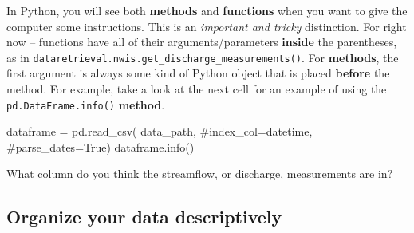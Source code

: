 \documentclass[
  letterpaper,
  DIV=11,
  numbers=noendperiod,
  oneside]{scrreprt}
\newenvironment{Shaded}{\begin{snugshade}}{\end{snugshade}}
\newcommand{\CommentTok}[1]{\textcolor[rgb]{0.37,0.37,0.37}{#1}}
\newcommand{\NormalTok}[1]{\textcolor[rgb]{0.00,0.23,0.31}{#1}}
\newcommand{\OperatorTok}[1]{\textcolor[rgb]{0.37,0.37,0.37}{#1}}
\begin{document}
\begin{tcolorbox}[enhanced jigsaw, colbacktitle=quarto-callout-tip-color!10!white, opacityback=0, bottomtitle=1mm, toptitle=1mm, bottomrule=.15mm, left=2mm, colframe=quarto-callout-tip-color-frame, leftrule=.75mm, opacitybacktitle=0.6, colback=white, rightrule=.15mm, toprule=.15mm, breakable, titlerule=0mm, title=\textcolor{quarto-callout-tip-color}{\faLightbulb}\hspace{0.5em}{Tip}, coltitle=black, arc=.35mm]

In Python, you will see both \textbf{methods} and \textbf{functions}
when you want to give the computer some instructions. This is an
\emph{important and tricky} distinction. For right now -- functions have
all of their arguments/parameters \textbf{inside} the parentheses, as in
\texttt{dataretrieval.nwis.get\_discharge\_measurements()}. For
\textbf{methods}, the first argument is always some kind of Python
object that is placed \textbf{before} the method. For example, take a
look at the next cell for an example of using the
\texttt{pd.DataFrame.info()} \textbf{method}.

\end{tcolorbox}

\begin{Shaded}
\begin{Highlighting}[]
\NormalTok{dataframe }\OperatorTok{=}\NormalTok{ pd.read\_csv(}
\NormalTok{    data\_path,}
    \CommentTok{\#index\_col=\textquotesingle{}datetime\textquotesingle{},}
    \CommentTok{\#parse\_dates=True)}
\NormalTok{dataframe.info()}
\end{Highlighting}
\end{Shaded}

\begin{tcolorbox}[enhanced jigsaw, colbacktitle=quarto-callout-color!10!white, opacityback=0, bottomtitle=1mm, toptitle=1mm, bottomrule=.15mm, left=2mm, colframe=quarto-callout-color-frame, leftrule=.75mm, opacitybacktitle=0.6, colback=white, rightrule=.15mm, toprule=.15mm, breakable, titlerule=0mm, title=\textcolor{quarto-callout-color}{\faInfo}\hspace{0.5em}{Reflect and Respond}, coltitle=black, arc=.35mm]

What column do you think the streamflow, or discharge, measurements are
in?

\end{tcolorbox}

\subsection{Organize your data
descriptively}\label{organize-your-data-descriptively}
\end{document}
